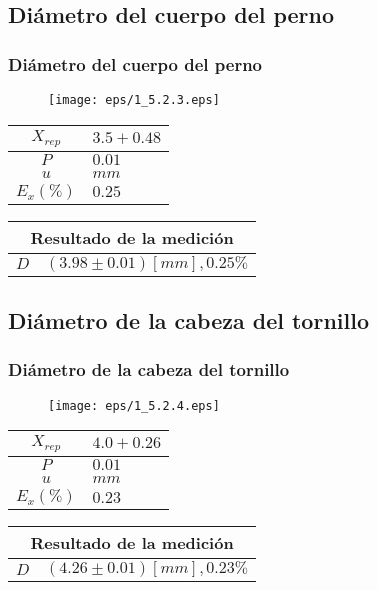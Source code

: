 \documentclass[letter,11pt]{beamer}
\begin{document}
\subsection{Diámetro del cuerpo del perno}
\begin{frame}
\frametitle{Diámetro del cuerpo del perno}
\vspace*{0.8cm}
\begin{figure}
\centering
\texttt{[image: eps/1\_5.2.3.eps]}
\end{figure}
\vspace*{0.4cm}
\scriptsize
\begin{tabular}{|c|>{\centering}m{1.8cm}<{\centering}|}
\hline
$X_{rep}$ &  $3.5+0.48$ \tabularnewline \hline
      $P$ &      $0.01$ \tabularnewline \hline
      $u$ &        $mm$ \tabularnewline \hline
$E_x(\%)$ &      $0.25$ \tabularnewline \hline
\end{tabular}
\quad
\begin{tabular}{|c|>{\centering}m{5.7cm}<{\centering}|}
\hline
\multicolumn{2}{|c|}{\textbf{Resultado de la medición}} \\ \hline
$D$ & $( 3.98\pm0.01)[mm], 0.25\%$ \tabularnewline \hline
\end{tabular}
\end{frame}

\subsection{Diámetro de la cabeza del tornillo}
\begin{frame}
\frametitle{Diámetro de la cabeza del tornillo}
\vspace*{0.8cm}
\begin{figure}
\centering
\texttt{[image: eps/1\_5.2.4.eps]}
\end{figure}
\vspace*{0.4cm}
\scriptsize
\begin{tabular}{|c|>{\centering}m{1.8cm}<{\centering}|}
\hline
$X_{rep}$ &  $4.0+0.26$ \tabularnewline \hline
      $P$ &      $0.01$ \tabularnewline \hline
      $u$ &        $mm$ \tabularnewline \hline
$E_x(\%)$ &      $0.23$ \tabularnewline \hline
\end{tabular}
\quad
\begin{tabular}{|c|>{\centering}m{5.7cm}<{\centering}|}
\hline
\multicolumn{2}{|c|}{\textbf{Resultado de la medición}} \\ \hline
$D$ & $( 4.26\pm0.01)[mm], 0.23\%$ \tabularnewline \hline
\end{tabular}
\end{frame}
\end{document}
